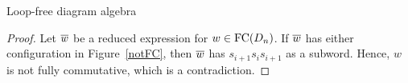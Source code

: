 \begin{section}{Loop-free diagram algebra}
%


\begin{proof}
Let $\overline{w}$ be a reduced expression for $w\in\operatorname{FC}(D_n)$. If $\overline{w}$ has either configuration in Figure~\ref{notFC}, then $\overline{w}$ has $s_{i+1}s_{i}s_{i+1}$ as a subword. Hence, $w$ is not fully commutative, which is a contradiction. 
\end{proof}


\end{section}
